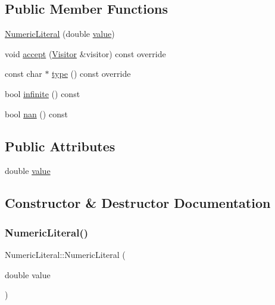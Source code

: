\subsection*{Public Member Functions}
\begin{DoxyCompactItemize}
\item 
\hyperlink{struct_numeric_literal_a7d8479432e5f17a657279050ca611e33}{Numeric\+Literal} (double \hyperlink{struct_numeric_literal_adeef869e11ca886648a0ccb723dc6639}{value})
\item 
void \hyperlink{struct_numeric_literal_aa18c06c1b739ba725cad0593c6bde1f4}{accept} (\hyperlink{struct_visitor}{Visitor} \&visitor) const override
\item 
const char $\ast$ \hyperlink{struct_numeric_literal_a685ec9d2678a8fb5df8b4ec1a580b762}{type} () const override
\item 
bool \hyperlink{struct_numeric_literal_ae14a02de1106d09cd661b18deee1ac2e}{infinite} () const
\item 
bool \hyperlink{struct_numeric_literal_a108e1c9532a08efac5e3cc1dca724c19}{nan} () const
\end{DoxyCompactItemize}
\subsection*{Public Attributes}
\begin{DoxyCompactItemize}
\item 
double \hyperlink{struct_numeric_literal_adeef869e11ca886648a0ccb723dc6639}{value}
\end{DoxyCompactItemize}


\subsection{Constructor \& Destructor Documentation}
\mbox{\label{struct_numeric_literal_a7d8479432e5f17a657279050ca611e33}} 
\subsubsection{\texorpdfstring{Numeric\+Literal()}{NumericLiteral()}}
{\footnotesize\ttfamily Numeric\+Literal\+::\+Numeric\+Literal (\begin{DoxyParamCaption}\item[{double}]{value }\end{DoxyParamCaption})\hspace{0.3cm}{\ttfamily [inline]}}



